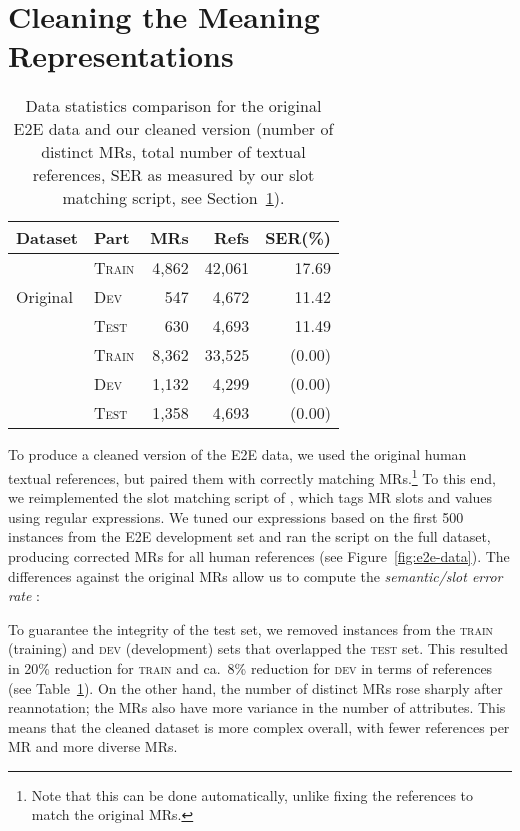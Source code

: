\documentclass[11pt,a4paper]{article}
\begin{document}
\section{Cleaning the Meaning Representations}
\label{sec:cleaning-mrs}

\begin{table}[tb]
\centering\small
\begin{tabular}{llrrr}\hline
\bf Dataset                  & \bf Part    &  \bf MRs & \bf Refs & \bf SER(\%) \\\hline
\multirow{3}{*}{Original}    & \textsc{Train}       &   4,862  &  42,061  &   17.69 \\
                             & \textsc{Dev}         &     547  &   4,672  &   11.42 \\
                             & \textsc{Test}        &     630  &   4,693  &   11.49 \\\hdashline[0.5pt/2pt]
\multirow{3}{*}{Cleaned}     & \textsc{Train}       &   8,362  &  33,525  &  (0.00) \\
                             & \textsc{Dev}         &   1,132  &   4,299  &  (0.00) \\
                             & \textsc{Test}        &   1,358  &   4,693  &  (0.00) \\\hline
\end{tabular}
\caption{Data statistics comparison for the original E2E data and our cleaned version (number of distinct MRs, total number of textual references, SER as measured by our slot matching script, see Section~\ref{sec:cleaning-mrs}).}
\label{tab:cleaned-data-stats}
\end{table}

To produce a cleaned version of the E2E data, we used the original human textual references, but paired them with correctly matching MRs.\footnote{Note that this can be done automatically, unlike fixing the references to match the original MRs.} 
To this end, we reimplemented the slot matching script of \citet{reed_can_2018}, which tags MR slots and values using regular expressions.
We tuned our expressions based on the first 500 instances from the E2E development set and ran the script on the full dataset, producing corrected MRs for all human references (see Figure~\ref{fig:e2e-data}).
The differences against the original MRs allow us to compute the \emph{semantic/slot error rate} \cite[SER;][]{wen:emnlp2015,reed_can_2018,dusek_evaluating_2019}:
\vspace{-0.1cm}

To guarantee the integrity of the test set,
we removed instances from the \textsc{train} (training) and \textsc{dev} (development) sets that overlapped the \textsc{test} set. This resulted in 20\% reduction for \textsc{train} and ca.~8\% reduction for \textsc{dev} in terms of references (see Table~\ref{tab:cleaned-data-stats}).
On the other hand, the number of distinct MRs rose sharply after reannotation; the MRs also have more variance in the number of attributes. 
This means that the cleaned dataset is more complex overall, with fewer references per MR and more diverse MRs.
\end{document}
